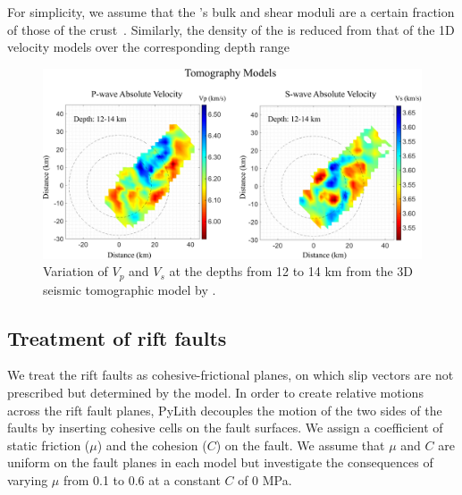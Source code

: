 \documentclass[draft]{agujournal2018}
\begin{document}
For simplicity, we assume that the 's bulk and shear moduli are a certain fraction of those of the crust~\citep[e.g.,][]{Baird_2010}. Similarly, the density of the  is reduced  from that of the 1D velocity models over the corresponding depth range 

\begin{figure}[ht]
\centering
\includegraphics[width=30pc]{Figures/TOMO_vel_models.png}
\caption{Variation of $V_p$ and $V_s$ at the depths from 12 to 14 km from the 3D seismic tomographic model by \citet{Powell_2017}.}
\label{figfour}
\end{figure}

\subsection{Treatment of rift faults}
We treat the rift faults as cohesive-frictional planes, on which slip vectors are not prescribed but determined by the model. In order to create relative motions across the rift fault planes, PyLith decouples the motion of the two sides of the faults by inserting cohesive cells on the fault surfaces. We assign a coefficient of static friction ($\mu$) and the cohesion ($C$) on the fault. We assume that $\mu$ and $C$ are uniform on the fault planes in each model but investigate the consequences of varying $\mu$ from 0.1 to 0.6 at a constant $C$ of 0 MPa. ~\citep{Marone_Chris}   
\end{document}
